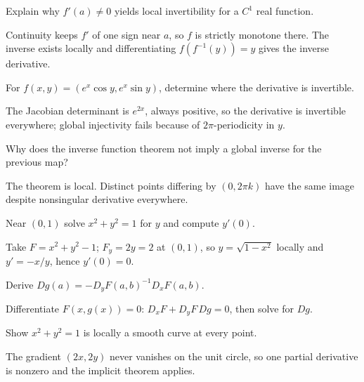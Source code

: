 \begin{problem}\label{prob:ii09-problem-01}
Explain why $f'(a)\ne0$ yields local invertibility for a $C^1$ real function.
\end{problem}
\begin{solution}
Continuity keeps $f'$ of one sign near $a$, so $f$ is strictly monotone there. The inverse exists locally and differentiating $f(f^{-1}(y))=y$ gives the inverse derivative.
\end{solution}

\begin{problem}\label{prob:ii09-problem-02}
For $f(x,y)=(e^x\cos y,e^x\sin y)$, determine where the derivative is invertible.
\end{problem}
\begin{solution}
The Jacobian determinant is $e^{2x}$, always positive, so the derivative is invertible everywhere; global injectivity fails because of $2\pi$-periodicity in $y$.
\end{solution}

\begin{problem}\label{prob:ii09-problem-03}
Why does the inverse function theorem not imply a global inverse for the previous map?
\end{problem}
\begin{solution}
The theorem is local. Distinct points differing by $(0,2\pi k)$ have the same image despite nonsingular derivative everywhere.
\end{solution}

\begin{problem}\label{prob:ii09-problem-04}
Near $(0,1)$ solve $x^2+y^2=1$ for $y$ and compute $y'(0)$.
\end{problem}
\begin{solution}
Take $F=x^2+y^2-1$; $F_y=2y=2$ at $(0,1)$, so $y=\sqrt{1-x^2}$ locally and $y'=-x/y$, hence $y'(0)=0$.
\end{solution}

\begin{problem}\label{prob:ii09-problem-05}
Derive $Dg(a)=-D_yF(a,b)^{-1}D_xF(a,b)$.
\end{problem}
\begin{solution}
Differentiate $F(x,g(x))=0$: $D_xF+D_yF\,Dg=0$, then solve for $Dg$.
\end{solution}

\begin{problem}\label{prob:ii09-problem-06}
Show $x^2+y^2=1$ is locally a smooth curve at every point.
\end{problem}
\begin{solution}
The gradient $(2x,2y)$ never vanishes on the unit circle, so one partial derivative is nonzero and the implicit theorem applies.
\end{solution}

